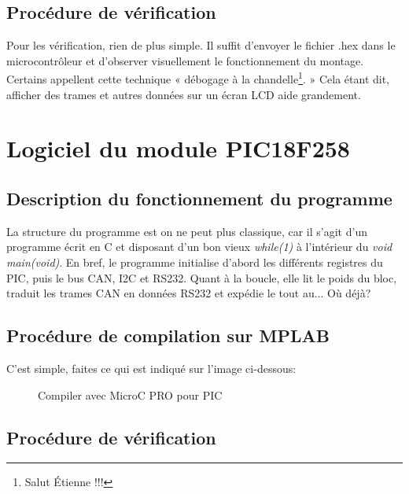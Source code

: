 \documentclass[10pt,a4paper,final]{article}
\begin{document}
\begin{spacing}{1.5}

\subsection{Procédure de vérification}
Pour les vérification, rien de plus simple. Il suffit d'envoyer le fichier .hex dans le microcontrôleur et d'observer visuellement le fonctionnement du montage. Certains appellent cette technique « débogage à la chandelle\footnote{Salut Étienne !!!}. » Cela étant dit, afficher des trames et autres données sur un écran LCD aide grandement.

\vfill
\pagebreak
\section{Logiciel du module PIC18F258}
\subsection{Description du fonctionnement du programme}
La structure du programme est on ne peut plus classique, car il s'agit d'un programme écrit en C et disposant d'un bon vieux \emph{while(1)} à l'intérieur du \emph{void main(void)}. En bref, le programme initialise d'abord les différents registres du PIC, puis le bus CAN, I2C et RS232. Quant à la boucle, elle lit le poids du bloc, traduit les trames CAN en données RS232 et expédie le tout au... Où déjà?
\subsection{Procédure de compilation sur MPLAB}
C'est simple, faites ce qui est indiqué sur l'image ci-dessous:
\begin{figure}[hbtp]
\caption{Compiler avec MicroC PRO pour PIC}
\centering
{}
\end{figure}

\subsection{Procédure de vérification}




\end{spacing}






\end{document}

